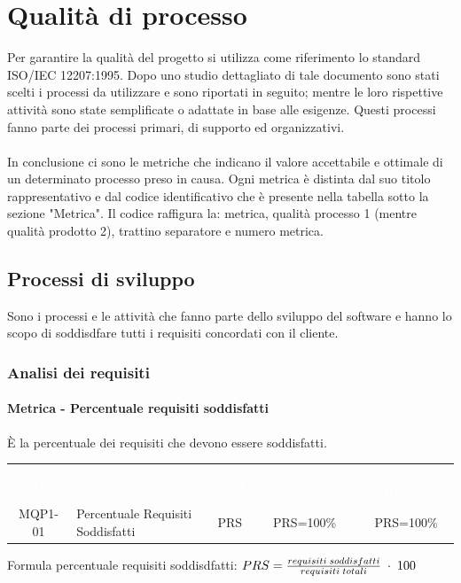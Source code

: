 \section{Qualità di processo}
Per garantire la qualità del progetto si utilizza come riferimento lo standard ISO/IEC 12207:1995. Dopo uno studio dettagliato di tale documento sono stati scelti i processi da utilizzare e sono riportati in seguito; mentre le loro rispettive attività sono state semplificate o adattate in base alle esigenze. Questi processi fanno parte dei processi primari, di supporto ed organizzativi. \\ \\ 
In conclusione ci sono le metriche che indicano il valore accettabile e ottimale di un determinato processo preso in causa. Ogni metrica è distinta dal suo titolo rappresentativo e dal codice identificativo che è presente nella tabella sotto la sezione "Metrica". Il codice raffigura la: metrica, qualità processo 1 (mentre qualità prodotto 2), trattino separatore e numero metrica.

\subsection{Processi di sviluppo}
Sono i processi e le attività che fanno parte dello sviluppo del software e hanno lo scopo di soddisdfare tutti i requisiti concordati con il cliente.
    \subsubsection{Analisi dei requisiti}
        \paragraph{Metrica - Percentuale requisiti soddisfatti}
        È la percentuale dei requisiti che devono essere soddisfatti.

        \renewcommand{\arraystretch}{1.5}
        \begin{longtable}{ c C{4cm} c c c}
        \textcolor{white}{\textbf{Metrica}} & \textcolor{white}{\textbf{Nome}} & \textcolor{white}{\textbf{Sigla}} & \textcolor{white}{\textbf{Valore Accettabile}} & \textcolor{white}{\textbf{Valore Ottimale}}\\
        MQP1-01 & Percentuale Requisiti Soddisfatti & PRS & PRS=100\% & PRS=100\% \\	     
        \end{longtable}
        Formula percentuale requisiti soddisdfatti: \begin{math}{PRS = {requisiti \; soddisfatti \over requisiti \; totali}\; \cdot \; 100}\end{math}

